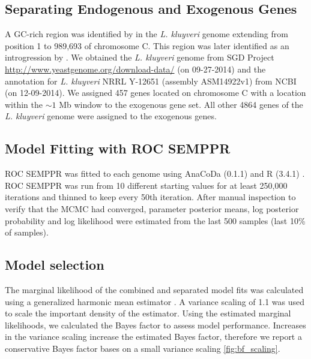 \documentclass[doublespacing,linenumbers]{bmcart-modified}
\newcommand{\kluyveri}{\textit{L. kluyveri}\xspace}
\newcommand{\ROC}{ROC SEMPPR\xspace}
\begin{document}
\subsection*{Separating Endogenous and Exogenous Genes}
A GC-rich region was identified by \cite{payen2009} in the \kluyveri genome extending from position 1 to 989,693 of chromosome C.
This region was later identified as an introgression by \cite{friedrich2015}.
We obtained the \kluyveri genome from SGD Project \url{http://www.yeastgenome.org/download-data/} (on 09-27-2014) and the annotation for \kluyveri NRRL Y-12651 (assembly ASM14922v1) from NCBI (on 12-09-2014).
We assigned 457 genes located on chromosome C with a location within the $\sim 1$ Mb window to the exogenous gene set.
All other 4864 genes of the \kluyveri genome were assigned to the exogenous genes.

\subsection*{Model Fitting with \ROC}
\ROC was fitted to each genome using AnaCoDa (0.1.1) \citep{landerer2018} and R (3.4.1) \citep{rcore}.
\ROC was run from 10 different starting values for at least 250,000 iterations and thinned to keep every 50th iteration.
After manual inspection to verify that the MCMC had converged, parameter posterior means, log posterior probability and log likelihood were estimated from the last 500 samples (last 10\% of samples).

\subsection*{Model selection}
The marginal likelihood of the combined and separated model fits was calculated using a generalized harmonic mean estimator \citep{Gronau2017}. A variance scaling of 1.1 was used to scale the important density of the estimator. Using the estimated marginal likelihoods, we calculated the Bayes factor to assess model performance. 
Increases in the variance scaling increase the estimated Bayes factor, therefore we report a conservative Bayes factor bases on a small variance scaling \ref{fig:bf_scaling}.
\end{document}

